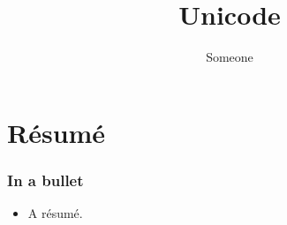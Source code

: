 \documentclass[t]{beamer}
\begin{document}
\title[Unicode]{Unicode%
  \label{unicode}}
\author[Someone]{Someone}
\date{}
\maketitle


\section{Résumé%
  \label{resume}%
}

\begin{frame}[fragile]
\frametitle{In a bullet}

\begin{itemize}[<+-| alert@+>]

\item A résumé.
\end{itemize}

\end{frame}
\end{document}
